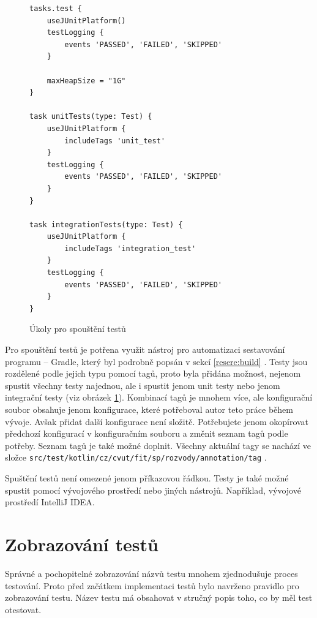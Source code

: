     \begin{figure}
        \begin{verbatim}
tasks.test {
    useJUnitPlatform()
    testLogging {
        events 'PASSED', 'FAILED', 'SKIPPED'
    }

    maxHeapSize = "1G"
}

task unitTests(type: Test) {
    useJUnitPlatform {
        includeTags 'unit_test'
    }
    testLogging {
        events 'PASSED', 'FAILED', 'SKIPPED'
    }
}

task integrationTests(type: Test) {
    useJUnitPlatform {
        includeTags 'integration_test'
    }
    testLogging {
        events 'PASSED', 'FAILED', 'SKIPPED'
    }
}
        \end{verbatim}
        \caption{Úkoly pro spouštění testů} 
        \label{code:gradle-tests}
    \end{figure}
    Pro spouštění testů je potřena využit nástroj pro automatizaci sestavování programu -- Gradle, který byl podrobně popsán v sekcí \ref{resere:build} . Testy jsou rozdělené podle jejich typu pomocí tagů, proto byla přidána možnost, nejenom spustit všechny testy najednou, ale i spustit jenom unit testy nebo jenom integrační testy (viz obrázek \ref{code:gradle-tests}). Kombinací tagů je mnohem více, ale konfigurační soubor obsahuje jenom konfigurace, které potřeboval autor teto práce během vývoje. Avšak přidat další konfigurace není složitě. Potřebujete jenom okopírovat předchozí konfigurací v konfiguračním souboru a změnit seznam tagů podle potřeby. Seznam tagů je také možné doplnit. Všechny aktuální tagy se nachází ve složce \verb|src/test/kotlin/cz/cvut/fit/sp/rozvody/annotation/tag| .
    
    Spuštění testů není omezené jenom příkazovou řádkou. Testy je také možné spustit pomocí vývojového prostředí nebo jiných nástrojů. Například, vývojové prostředí IntelliJ IDEA. 
\section{Zobrazování testů}\label{testovani:zobrazovani}
    Správné a pochopitelné zobrazování názvů testu mnohem zjednodušuje proces testování. Proto před začátkem implementaci testů bylo navrženo pravidlo pro zobrazování testu. Název testu má obsahovat v stručný popis toho, co by měl test otestovat. 
    
